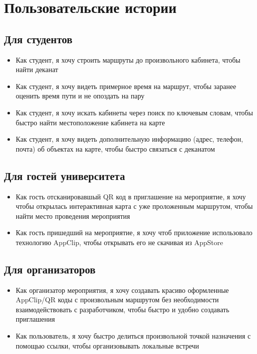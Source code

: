   \section{Пользовательские истории}
    \subsection{Для студентов}
      \begin{itemize}
        \item Как студент, я хочу строить маршруты до произвольного кабинета, чтобы найти деканат
        \item Как студент, я хочу видеть примерное время на маршрут, чтобы заранее оценить время пути и не опоздать на пару
        \item Как студент, я хочу искать кабинеты через поиск по ключевым словам, чтобы быстро найти местоположение кабинета на карте
        \item Как студент, я хочу видеть дополнительную информацию (адрес, телефон, почта) об объектах на карте, чтобы быстро связаться с деканатом
      \end{itemize}
    \subsection{Для гостей университета}
      \begin{itemize}
        \item Как гость отсканировавшый QR код в приглашение на мероприятие, я хочу чтобы открылась интерактивная карта с уже проложенным маршрутом, чтобы найти место проведения мероприятия
        \item Как гость пришедший на мероприятие, я хочу чтоб приложение использовало технологию AppClip, чтобы открывать его не скачивая из AppStore
      \end{itemize}
    \subsection{Для организаторов}
      \begin{itemize}
        \item Как организатор мероприятия, я хочу создавать красиво оформленные AppClip/QR коды с произвольным маршрутом без необходимости взаимодействовать с разработчиком, чтобы быстро и удобно создавать приглашения
        \item Как пользователь, я хочу быстро делиться произвольной точкой назначения с помощью ссылки, чтобы организовывать локальные встречи
      \end{itemize}

